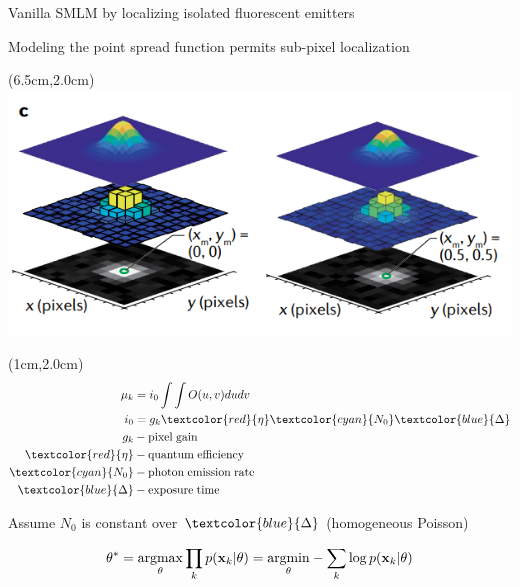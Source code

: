 \documentclass{beamer}					%
\begin{document}
\begin{frame}{Vanilla SMLM by localizing isolated fluorescent emitters}

Modeling the point spread function permits sub-pixel localization 

\begin{textblock*}{8cm}(6.5cm,2.0cm)
\includegraphics[width=\textwidth]{media/Model.png}
\end{textblock*}

\begin{textblock*}{2cm}(1cm,2.0cm)
\begin{align*}
\mu_{k} &= i_{0}\int\int O(u,v)dudv\\
i_{0} &= g_{k}\textcolor{red}{\eta} \textcolor{cyan}{N_{0}}\textcolor{blue}{\Delta} 
\\
g_{k} &- \mathrm{pixel\; gain}\\
\textcolor{red}{\eta} &- \mathrm{quantum\; efficiency}\\
\textcolor{cyan}{N_{0}} &- \mathrm{photon\; emission\; rate}\\
\textcolor{blue}{\Delta} &- \mathrm{exposure\; time}
\end{align*}
\end{textblock*}

\vspace{2in}

Assume $N_{0}$ is constant over $\textcolor{blue}{\Delta}$ (homogeneous Poisson)

\begin{equation*}
\theta^{*} = \underset{\theta}{\mathrm{argmax}}\prod_{k}p(\bold{x}_{k}|\theta)= \underset{\theta}{\mathrm{argmin}}-\sum_{k}\log p(\bold{x}_{k}|\theta)
\end{equation*}

\end{frame}
\end{document}
